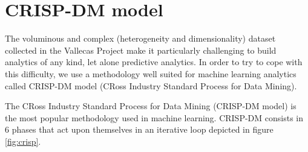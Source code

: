 \documentclass[11pt]{article}
\begin{document}
\section{CRISP-DM model}
\label{se:crisp}
The voluminous and complex (heterogeneity and dimensionality) dataset collected in the Vallecas Project make it particularly challenging to build analytics of any kind, let alone predictive analytics.
In order to try to cope with this difficulty, we use a methodology well suited for machine learning analytics called CRISP-DM model (CRoss Industry Standard Process for Data Mining).
  
The CRoss Industry Standard Process for Data Mining (CRISP-DM model) is the most popular methodology used in machine learning. CRISP-DM consists in 6 phases that act upon themselves in an iterative loop depicted in figure \ref{fig:crisp}.
\end{document}
